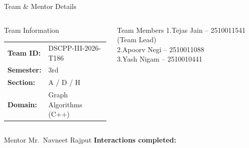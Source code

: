 \documentclass[aspectratio=169,11pt]{beamer}
\begin{document}
\begin{frame}{Team \& Mentor Details}
\small

\begin{columns}[T,totalwidth=\textwidth]


\begin{block}{Team Information}
\begin{tabular}{@{}ll@{}}
\textbf{Team ID:} & DSCPP-III-2026-T186\\
\textbf{Semester:} & 3rd\\
\textbf{Section:} & A / D / H\\
\textbf{Domain:} & Graph Algorithms (C++)
\end{tabular}
\end{block}


\begin{block}{Team Members}
1.\quad Tejas Jain -- 2510011541 (Team Lead)\\[1mm]
2.\quad Apoorv Negi -- 2510011088\\[1mm]
3.\quad Yash Nigam -- 2510010441
\end{block}

\end{columns}

\vspace{2mm}

\begin{block}{Mentor}
Mr.\ Navneet Rajput
\hfill
\textbf{Interactions completed:}
\underline{\hspace{12mm}}
\end{block}

\end{frame}
\end{document}
